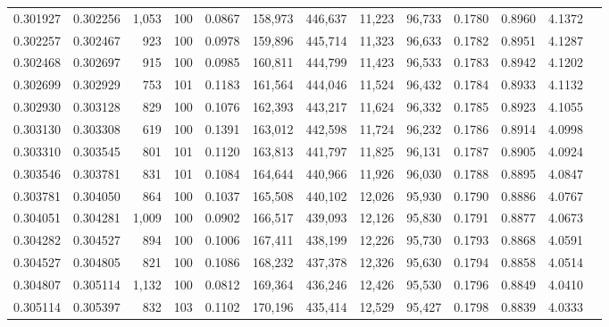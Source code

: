 \begin{tabular}{rrrrrrrrrrrrr}
0.301927 & 0.302256 & 1,053 & 100 &                                     0.0867 & 158,973 & 446,637 &  11,223 &  96,733 & 0.1780 & 0.8960 & 4.1372 \\
0.302257 & 0.302467 &   923 & 100 &                                     0.0978 & 159,896 & 445,714 &  11,323 &  96,633 & 0.1782 & 0.8951 & 4.1287 \\
0.302468 & 0.302697 &   915 & 100 &                                     0.0985 & 160,811 & 444,799 &  11,423 &  96,533 & 0.1783 & 0.8942 & 4.1202 \\
0.302699 & 0.302929 &   753 & 101 &                                     0.1183 & 161,564 & 444,046 &  11,524 &  96,432 & 0.1784 & 0.8933 & 4.1132 \\
0.302930 & 0.303128 &   829 & 100 &                                     0.1076 & 162,393 & 443,217 &  11,624 &  96,332 & 0.1785 & 0.8923 & 4.1055 \\
0.303130 & 0.303308 &   619 & 100 &                                     0.1391 & 163,012 & 442,598 &  11,724 &  96,232 & 0.1786 & 0.8914 & 4.0998 \\
0.303310 & 0.303545 &   801 & 101 &                                     0.1120 & 163,813 & 441,797 &  11,825 &  96,131 & 0.1787 & 0.8905 & 4.0924 \\
0.303546 & 0.303781 &   831 & 101 &                                     0.1084 & 164,644 & 440,966 &  11,926 &  96,030 & 0.1788 & 0.8895 & 4.0847 \\
0.303781 & 0.304050 &   864 & 100 &                                     0.1037 & 165,508 & 440,102 &  12,026 &  95,930 & 0.1790 & 0.8886 & 4.0767 \\
0.304051 & 0.304281 & 1,009 & 100 &                                     0.0902 & 166,517 & 439,093 &  12,126 &  95,830 & 0.1791 & 0.8877 & 4.0673 \\
0.304282 & 0.304527 &   894 & 100 &                                     0.1006 & 167,411 & 438,199 &  12,226 &  95,730 & 0.1793 & 0.8868 & 4.0591 \\
0.304527 & 0.304805 &   821 & 100 &                                     0.1086 & 168,232 & 437,378 &  12,326 &  95,630 & 0.1794 & 0.8858 & 4.0514 \\
0.304807 & 0.305114 & 1,132 & 100 &                                     0.0812 & 169,364 & 436,246 &  12,426 &  95,530 & 0.1796 & 0.8849 & 4.0410 \\
0.305114 & 0.305397 &   832 & 103 &                                     0.1102 & 170,196 & 435,414 &  12,529 &  95,427 & 0.1798 & 0.8839 & 4.0333 \\

\end{tabular}
